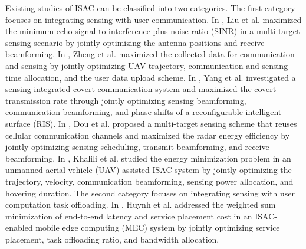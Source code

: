 \documentclass[10pt,journal,compsoc]{IEEEtran}
\begin{document}
Existing studies of ISAC can be classified into two categories. 
The first category focuses on integrating sensing with user communication\cite{
Related works:ISAC:IoTJ:Pinching-Antennas-Assisted,
Related works:ISAC:JSAC:Dual-Functional-UAV-Empowered,
Related works:ISAC:JSAC:Robust-Covert-ISAC,
Related works:ISAC:TWC:Channel-Sharing-Aided,
Related works:ISAC:TWC:Efficient-UAV-Hovering}. 
In \cite{Related works:ISAC:IoTJ:Pinching-Antennas-Assisted}, Liu et al. maximized the minimum echo signal-to-interference-plus-noise ratio (SINR) in a multi-target sensing scenario by jointly optimizing the antenna positions and receive beamforming. 
In \cite{Related works:ISAC:JSAC:Dual-Functional-UAV-Empowered}, Zheng et al. maximized the collected data for communication and sensing by jointly optimizing UAV trajectory, communication and sensing time allocation, and the user data upload scheme.
In \cite{Related works:ISAC:JSAC:Robust-Covert-ISAC}, Yang et al. investigated a sensing-integrated covert communication system and maximized the covert transmission rate through jointly optimizing sensing beamforming, communication beamforming, and phase shifts of a reconfigurable intelligent surface (RIS). 
In \cite{Related works:ISAC:TWC:Channel-Sharing-Aided}, Dou et al. proposed a multi-target sensing scheme that reuses cellular communication channels and maximized the radar energy efficiency by jointly optimizing sensing scheduling, transmit beamforming, and receive beamforming. 
In \cite{Related works:ISAC:TWC:Efficient-UAV-Hovering}, Khalili et al. studied the energy minimization problem in an unmanned aerial vehicle (UAV)-assisted ISAC system by jointly optimizing the trajectory, velocity, communication beamforming, sensing power allocation, and hovering duration.
The second category focuses on integrating sensing with user computation task offloading\cite{
Related works:ISAC-PRO:IoTJ:Joint-Sensing-Communications,
Related works:ISAC-PRO:TVT:URLLC-Aware-Trajectory,
Related works:ISAC-PRO:WCL:Integrated-Sensing-And,
Related works:ISAC-PRO:JSAC:NOMA-Aided-Joint}. 
In \cite{Related works:ISAC-PRO:IoTJ:Joint-Sensing-Communications}, Huynh et al. addressed the weighted sum minimization of end-to-end latency and service placement cost in an ISAC-enabled mobile edge computing (MEC) system by jointly optimizing service placement, task offloading ratio, and bandwidth allocation.
\end{document}
